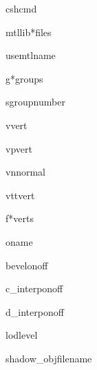 \begin{methoddesc}{csh}{cmd}
\end{methoddesc}

\begin{methoddesc}{mtllib}{*files}
\end{methoddesc}

\begin{methoddesc}{usemtl}{name}
\end{methoddesc}

\begin{methoddesc}{g}{*groups}
\end{methoddesc}

\begin{methoddesc}{s}{groupnumber}
\end{methoddesc}

\begin{methoddesc}{v}{vert}
\end{methoddesc}

\begin{methoddesc}{vp}{vert}
\end{methoddesc}

\begin{methoddesc}{vn}{normal}
\end{methoddesc}

\begin{methoddesc}{vt}{tvert}
\end{methoddesc}

\begin{methoddesc}{f}{*verts}
\end{methoddesc}

\begin{methoddesc}{o}{name}
\end{methoddesc}

\begin{methoddesc}{bevel}{onoff}
\end{methoddesc}

\begin{methoddesc}{c_interp}{onoff}
\end{methoddesc}

\begin{methoddesc}{d_interp}{onoff}
\end{methoddesc}

\begin{methoddesc}{lod}{level}
\end{methoddesc}

\begin{methoddesc}{shadow_obj}{filename}
\end{methoddesc}

